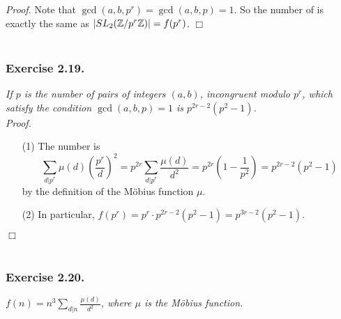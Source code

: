 \documentclass{article}
\begin{document}
\emph{Proof.}
  Note that $\gcd(a,b,p^r) = \gcd(a,b,p) = 1$.
  So the number of is exactly the same as $\abs{ SL_2(\mathbb{Z}/p^r\mathbb{Z}) } = f(p^r)$.
$\Box$ \\\\






\subsubsection*{Exercise 2.19.}
\emph{If $p$ is the number of pairs of integers $(a,b)$, incongruent modulo $p^r$,
which satisfy the condition $\gcd(a,b,p) = 1$ is $p^{2r-2}(p^2-1)$.} \\



\emph{Proof.}
\begin{enumerate}
\item[(1)]
  The number is
  \[
    \sum_{d|p^r} \mu(d)\left( \frac{p^r}{d} \right)^2
    = p^{2r} \sum_{d|p^r} \frac{\mu(d)}{d^2}
    = p^{2r} \left(1 - \frac{1}{p^2}\right)
    = p^{2r-2}(p^2 - 1)
  \]
  by the definition of the M\"obius function $\mu$.

\item[(2)]
  In particular,
  $f(p^r) = p^r \cdot p^{2r-2}(p^2 - 1) = p^{3r-2}(p^2 - 1)$.
\end{enumerate}
$\Box$ \\\\






\subsubsection*{Exercise 2.20.}
\emph{$f(n) = n^3 \sum_{d|n} \frac{\mu(d)}{d^2}$, where $\mu$ is the M\"obius function.} \\
\end{document}
